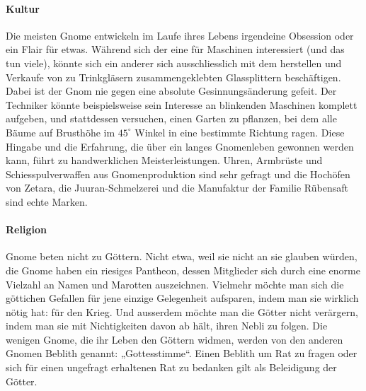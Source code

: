 \documentclass[10pt,twoside,twocolumn,openany]{book}
\begin{document}
\paragraph{Kultur}
Die meisten Gnome entwickeln im Laufe ihres Lebens irgendeine Obsession oder ein Flair für etwas. Während sich der eine für Maschinen interessiert (und das tun viele), könnte sich ein anderer sich ausschliesslich mit dem herstellen und Verkaufe von zu Trinkgläsern zusammengeklebten Glassplittern beschäftigen. Dabei ist der Gnom nie gegen eine absolute Gesinnungsänderung gefeit. Der Techniker könnte beispielsweise sein Interesse an blinkenden Maschinen komplett aufgeben, und stattdessen versuchen, einen Garten zu pflanzen, bei dem alle Bäume auf Brusthöhe im $45^{\circ}$ Winkel in eine bestimmte Richtung ragen. Diese Hingabe und die Erfahrung, die über ein langes Gnomenleben gewonnen werden kann,  führt zu handwerklichen Meisterleistungen. Uhren, Armbrüste und Schiesspulverwaffen aus Gnomenproduktion sind sehr gefragt und die  Hochöfen von Zetara, die Juuran-Schmelzerei und die Manufaktur der Familie Rübensaft sind echte Marken.



\paragraph{Religion}
Gnome beten nicht zu Göttern. Nicht etwa, weil sie nicht an sie glauben würden, die Gnome haben ein riesiges Pantheon, dessen Mitglieder sich durch eine enorme Vielzahl an Namen und Marotten auszeichnen.  Vielmehr möchte man sich die göttichen Gefallen für jene einzige Gelegenheit aufsparen, indem man sie wirklich nötig hat: für den Krieg. Und ausserdem möchte man die Götter nicht verärgern, indem man sie mit Nichtigkeiten davon ab hält, ihren Nebli zu folgen. Die wenigen Gnome, die ihr Leben den Göttern widmen,  werden von den anderen Gnomen Beblith genannt: „Gottesstimme“.  Einen Beblith um Rat zu fragen oder sich für einen ungefragt erhaltenen Rat zu bedanken gilt als Beleidigung der Götter.
\end{document}

